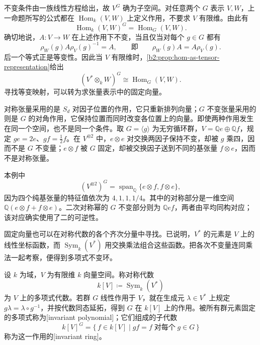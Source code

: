 不变条件由一族线性方程给出，故 \(V^G\) 确为子空间。对任意两个 \(G\) 表示 \(V,W\)，上一命题所写的公式都在 \(\operatorname{Hom}_k(V,W)\) 上定义作用，不要求 \(V\) 有限维。由此有
\[
	\operatorname{Hom}_k(V,W)^G=\operatorname{Hom}_G(V,W).
\]
确切地说，\(A:V\to W\) 在上述作用下不变，当且仅当对每个 \(g\in G\) 都有
\[
	\rho_W(g)A\rho_V(g)^{-1}=A, \qquad\text{即}\qquad \rho_W(g)A=A\rho_V(g).
\]
后一个等式正是等变性。因此当 \(V\) 有限维时，\cref{b2:prop:hom-as-tensor-representation}给出
\[
	(V^*\otimes_kW)^G\cong\operatorname{Hom}_G(V,W).
\]
寻找等变映射，可以转为求张量表示中的固定向量。

\ProseParagraphBreak
对称张量采用的是 \(S_d\) 对因子位置的作用，它只重新排列向量；\(G\) 不变张量采用的则是 \(G\) 的对角作用，它保持位置而同时改变各位置上的向量。即使两种作用发生在同一个空间，也不是同一个条件。取 \(G=\langle g\rangle\) 为无穷循环群，\(V=\mathbb Qe\oplus\mathbb Qf\)，规定 \(ge=2e\)、\(gf=\tfrac12f\)。在 \(V^{\otimes2}\) 中，\(e\otimes e\) 对交换两因子保持不变，却被 \(g\) 乘四，因而不是 \(G\) 不变量；\(e\otimes f\) 被 \(G\) 固定，却被交换因子送到不同的基张量 \(f\otimes e\)，因而不是对称张量。

\ProseParagraphBreak
本例中
\[
	(V^{\otimes2})^G=\operatorname{span}_{\mathbb Q}\{e\otimes f,f\otimes e\},
\]
因为四个纯基张量的特征值依次为 \(4,1,1,1/4\)。其中的对称部分是一维空间 \(\mathbb Q(e\otimes f+f\otimes e)\)。二次对称幂的 \(G\) 不变部分则为 \(\mathbb Q ef\)，两者由平均同构对应；该对应确实使用了二的可逆性。

\ProseParagraphBreak
固定向量也可以在对称代数的各个齐次分量中寻找。已说明，\(V^*\) 的元素是 \(V\) 上的线性坐标函数，而 \(\operatorname{Sym}_k(V^*)\) 用交换乘法组合这些函数。把各次不变量连同乘法一起考察，便得到多项式不变环。

\begin{definition}\label{b2:def:polynomial-invariant-ring}
	设 \(k\) 为域，\(V\) 为有限维 \(k\) 向量空间。称对称代数
	\[
		k[V]\coloneqq\operatorname{Sym}_k(V^*)
	\]
	为 \(V\) 上的多项式代数。若群 \(G\) 线性作用于 \(V\)，就在生成元 \(\lambda\in V^*\) 上规定 \(g\lambda=\lambda\circ g^{-1}\)，并按代数同态延拓，得到 \(G\) 在 \(k[V]\) 上的作用。被所有群元素固定的多项式称为[invariant polynomial]；它们组成的子代数
	\[
		k[V]^G=\{\,f\in k[V]\mid gf=f\;\text{对每个}\;g\in G\,\}
	\]
	称为这一作用的[invariant ring]。
\end{definition}


